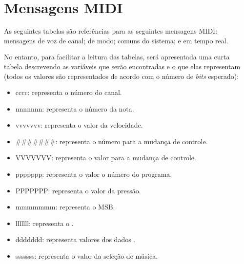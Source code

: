     \section{Mensagens MIDI}

        As seguintes tabelas são referências para as seguintes mensagens MIDI: mensagens de voz de canal; de modo; comuns do sistema; e em tempo real.

        No entanto, para facilitar a leitura das tabelas, será apresentada uma curta tabela descrevendo as variáveis que serão encontradas e o que elas representam (todos os valores são representados de acordo com o número de \textit{bits} esperado):

        \begin{itemize}
                \item cccc: representa o número do canal.

                \item nnnnnnn: representa o número da nota.

                \item vvvvvvv: representa o valor da velocidade.

                \item \#\#\#\#\#\#\#: representa o número para a mudança de controle.

                \item VVVVVVV: representa o valor para a mudança de controle.

                \item ppppppp: representa o valor o número do programa.

                \item PPPPPPP: representa o valor da pressão.

                \item mmmmmmm: representa o MSB.

                \item lllllll: representa o .

                \item ddddddd: representa valores dos dados .

                \item sssssss: representa o valor da seleção de música.
        \end{itemize}


